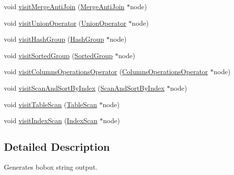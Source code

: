 \begin{DoxyCompactItemize}
\item 
void \hyperlink{classrafe_1_1_bobox_plan_writing_physical_operator_visitor_a44f741c5e3ad55bdb934641371057000}{visit\+Merge\+Anti\+Join} (\hyperlink{classrafe_1_1_merge_anti_join}{Merge\+Anti\+Join} $\ast$node)
\item 
void \hyperlink{classrafe_1_1_bobox_plan_writing_physical_operator_visitor_a20fc58d77f1fba7b536bd8c0920641c5}{visit\+Union\+Operator} (\hyperlink{classrafe_1_1_union_operator}{Union\+Operator} $\ast$node)
\item 
void \hyperlink{classrafe_1_1_bobox_plan_writing_physical_operator_visitor_a8f9890744b4a3a64e1d574d4d12bc1ca}{visit\+Hash\+Group} (\hyperlink{classrafe_1_1_hash_group}{Hash\+Group} $\ast$node)
\item 
void \hyperlink{classrafe_1_1_bobox_plan_writing_physical_operator_visitor_ab0f53218eefa3103840afe5bf7fcf9ab}{visit\+Sorted\+Group} (\hyperlink{classrafe_1_1_sorted_group}{Sorted\+Group} $\ast$node)
\item 
void \hyperlink{classrafe_1_1_bobox_plan_writing_physical_operator_visitor_a38591cef68b9a97fc8e854827d33103b}{visit\+Columns\+Operations\+Operator} (\hyperlink{classrafe_1_1_columns_operations_operator}{Columns\+Operations\+Operator} $\ast$node)
\item 
void \hyperlink{classrafe_1_1_bobox_plan_writing_physical_operator_visitor_a747d8a89471bcf19b29d4eb8f9be5196}{visit\+Scan\+And\+Sort\+By\+Index} (\hyperlink{classrafe_1_1_scan_and_sort_by_index}{Scan\+And\+Sort\+By\+Index} $\ast$node)
\item 
void \hyperlink{classrafe_1_1_bobox_plan_writing_physical_operator_visitor_ab7918b1aa4d801ec86d42b3cbb6d0fe1}{visit\+Table\+Scan} (\hyperlink{classrafe_1_1_table_scan}{Table\+Scan} $\ast$node)
\item 
void \hyperlink{classrafe_1_1_bobox_plan_writing_physical_operator_visitor_a600bfeaec99ab68049069543bad70908}{visit\+Index\+Scan} (\hyperlink{classrafe_1_1_index_scan}{Index\+Scan} $\ast$node)
\end{DoxyCompactItemize}


\subsection{Detailed Description}
Generates bobox string output. 

